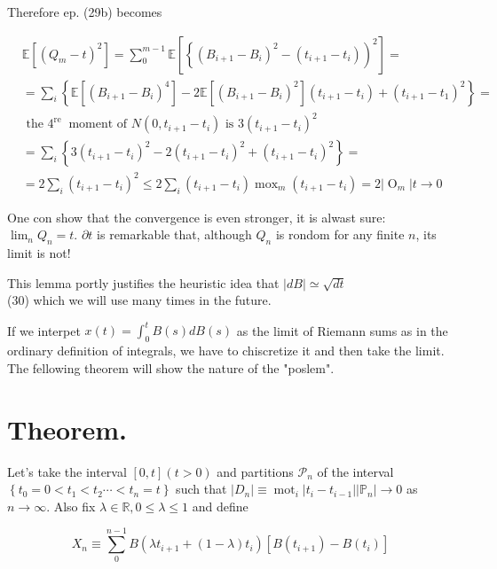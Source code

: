 \documentclass[10pt]{article}
\begin{document}
Therefore ep. (29b) becomes

$$
\begin{aligned}
& \mathbb{E}\left[\left(Q_{m}-t\right)^{2}\right]=\sum_{0}^{m-1} \mathbb{E}\left[\left\{\left(B_{i+1}-B_{i}\right)^{2}-\left(t_{i+1}-t_{i}\right)\right)^{2}\right]= \\
& =\sum_{i}\left\{\mathbb{E}\left[\left(B_{i+1}-B_{i}\right)^{4}\right]-2 \mathbb{E}\left[\left(B_{i+1}-B_{i}\right)^{2}\right]\left(t_{i+1}-t_{i}\right)+\left(t_{i+1}-t_{1}\right)^{2}\right\}= \\
& \text { the } 4^{\text {re }} \text { moment of } N\left(0, t_{i+1}-t_{i}\right) \text { is } 3\left(t_{i+1}-t_{i}\right)^{2} \\
& =\sum_{i}\left\{3\left(t_{i+1}-t_{i}\right)^{2}-2\left(t_{i+1}-t_{i}\right)^{2}+\left(t_{i+1}-t_{i}\right)^{2}\right\}= \\
& =2 \sum_{i}\left(t_{i+1}-t_{i}\right)^{2} \leq 2 \sum_{i}\left(t_{i+1}-t_{i}\right) \operatorname{mox}_{m}\left(t_{i+1}-t_{i}\right)=2\left|\operatorname{O}_{m}\right| t \rightarrow 0
\end{aligned}
$$

One con show that the convergence is even stronger, it is alwast sure: $\lim _{n} Q_{n}=t$. $\partial t$ is remarkable that, although $Q_{n}$ is rondom for any finite $n$, its limit is not!

This lemma portly justifies the heuristic idea that $|d B| \simeq \sqrt{d t}$\\
(30) which we will use many times in the future.

If we interpet $x(t)=\int_{0}^{t} B(s) d B(s)$ as the limit of Riemann sums as in the ordinary definition of integrals, we have to chiscretize it and then take the limit. The fellowing theorem will show the nature of the "poslem".

\section*{Theorem.}
Let's take the interval $[0, t](t>0)$ and partitions $\mathcal{P}_{n}$ of the interval $\left\{t_{0}=0<t_{1}<t_{2} \cdots<t_{n}=t\right\}$ such that $\left|D_{n}\right| \equiv \operatorname{mot}_{i}\left|t_{i}-t_{i-1}\right| \left|\mathbb{P}_{n}\right| \rightarrow 0$ as $n \rightarrow \infty$. Also fix $\lambda \in \mathbb{R}, 0 \leq \lambda \leq 1$ and define

$$
X_{n} \equiv \sum_{0}^{n-1} B\left(\lambda t_{i+1}+(1-\lambda) t_{i}\right)\left[B\left(t_{i+1}\right)-B\left(t_{i}\right)\right]
$$
\end{document}
